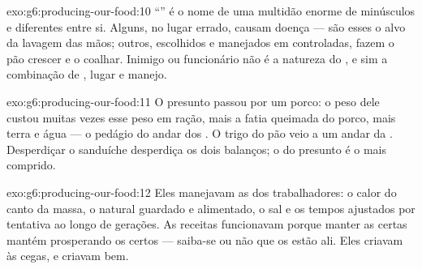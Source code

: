 \begin{solution}{exo:g6:producing-our-food:10}
``'' é o nome de uma multidão enorme de  minúsculos
e diferentes entre si. Alguns, no lugar errado, causam doença --- são
esses o alvo da lavagem das mãos; outros, escolhidos e manejados em
 controladas, fazem o pão crescer e o  coalhar. Inimigo
ou funcionário não é a natureza do , e sim a combinação de
, lugar e manejo.
\end{solution}

\begin{solution}{exo:g6:producing-our-food:11}
O presunto passou por um porco: o peso dele custou muitas vezes esse
peso em ração, mais a fatia queimada do porco, mais terra e água --- o
pedágio do andar dos . O trigo do pão veio a um andar da
. Desperdiçar o sanduíche desperdiça os dois balanços; o do
presunto é o mais comprido.
\end{solution}

\begin{solution}{exo:g6:producing-our-food:12}
Eles manejavam as \emph{} dos trabalhadores: o calor do canto
da massa, o  natural guardado e alimentado, o sal e os tempos
ajustados por tentativa ao longo de gerações. As receitas funcionavam
porque manter as  certas mantém prosperando os 
certos --- saiba-se ou não que os  estão ali. Eles criavam
 às cegas, e criavam bem.
\end{solution}

